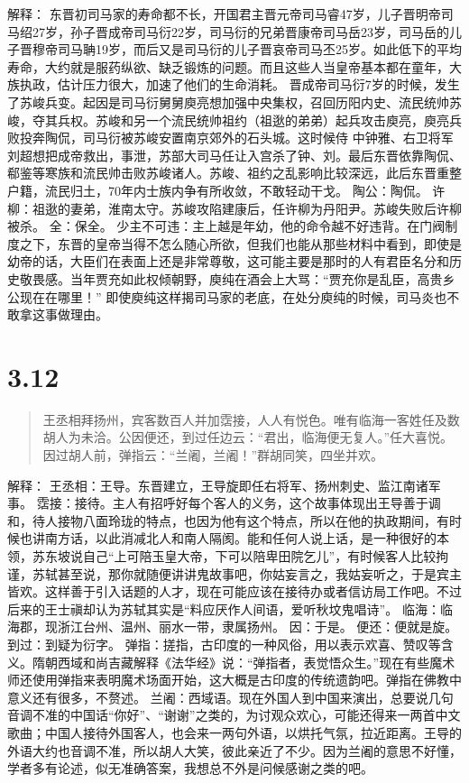 \documentclass[]{book}
\begin{document}
解释：
东晋初司马家的寿命都不长，开国君主晋元帝司马睿47岁，儿子晋明帝司马绍27岁，孙子晋成帝司马衍22岁，司马衍的兄弟晋康帝司马岳23岁，司马岳的儿子晋穆帝司马聃19岁，而后又是司马衍的儿子晋哀帝司马丕25岁。如此低下的平均寿命，大约就是服药纵欲、缺乏锻炼的问题。而且这些人当皇帝基本都在童年，大族执政，估计压力很大，加速了他们的生命消耗。
晋成帝司马衍7岁的时候，发生了苏峻兵变。起因是司马衍舅舅庾亮想加强中央集权，召回历阳内史、流民统帅苏峻，夺其兵权。苏峻和另一个流民统帅祖约（祖逖的弟弟）起兵攻击庾亮，庾亮兵败投奔陶侃，司马衍被苏峻安置南京郊外的石头城。这时候侍
中钟雅、右卫将军刘超想把成帝救出，事泄，苏部大司马任让入宫杀了钟、刘。最后东晋依靠陶侃、郗鉴等寒族和流民帅击败苏峻诸人。苏峻、祖约之乱影响比较深远，此后东晋重整户籍，流民归土，70年内士族内争有所收敛，不敢轻动干戈。
陶公：陶侃。
许柳：祖逖的妻弟，淮南太守。苏峻攻陷建康后，任许柳为丹阳尹。苏峻失败后许柳被杀。
全：保全。
少主不可违：主上越是年幼，他的命令越不好违背。在门阀制度之下，东晋的皇帝当得不怎么随心所欲，但我们也能从那些材料中看到，即使是幼帝的话，大臣们在表面上还是非常尊敬，这可能主要是那时的人有君臣名分和历史敬畏感。当年贾充如此权倾朝野，庾纯在酒会上大骂：``贾充你是乱臣，高贵乡公现在在哪里！''
即使庾纯这样揭司马家的老底，在处分庾纯的时候，司马炎也不敢拿这事做理由。

\section{3.12}\label{section-166}

\begin{quote}
王丞相拜扬州，宾客数百人并加霑接，人人有悦色。唯有临海一客姓任及数胡人为未洽。公因便还，到过任边云：``君出，临海便无复人。''任大喜悦。因过胡人前，弹指云：``兰阇，兰阇！''群胡同笑，四坐并欢。
\end{quote}

解释：
王丞相：王导。东晋建立，王导旋即任右将军、扬州刺史、监江南诸军事。
霑接：接待。主人有招呼好每个客人的义务，这个故事体现出王导善于调和，待人接物八面玲珑的特点，也因为他有这个特点，所以在他的执政期间，有时候也讲南方话，以此消减北人和南人隔阂。能和任何人说上话，是一种很好的本领，苏东坡说自己``上可陪玉皇大帝，下可以陪卑田院乞儿''，有时候客人比较拘谨，苏轼甚至说，那你就随便讲讲鬼故事吧，你姑妄言之，我姑妄听之，于是宾主皆欢。这样善于引入话题的人才，现在可能应该在接待办或者信访局工作吧。不过后来的王士禛却认为苏轼其实是``料应厌作人间语，爱听秋坟鬼唱诗''。
临海：临海郡，现浙江台州、温州、丽水一带，隶属扬州。 因：于是。
便还：便就是旋。 到过：到疑为衍字。
弹指：搓指，古印度的一种风俗，用以表示欢喜、赞叹等含义。隋朝西域和尚吉藏解释《法华经》说：``弹指者，表觉悟众生。''现在有些魔术师还使用弹指来表明魔术场面开始，这大概是古印度的传统遗韵吧。弹指在佛教中意义还有很多，不赘述。
兰阇：西域语。现在外国人到中国来演出，总要说几句音调不准的中国话``你好''、``谢谢''之类的，为讨观众欢心，可能还得来一两首中文歌曲；中国人接待外国客人，也会来一两句外语，以烘托气氛，拉近距离。王导的外语大约也音调不准，所以胡人大笑，彼此亲近了不少。因为兰阇的意思不好懂，学者多有论述，似无准确答案，我想总不外是问候感谢之类的吧。
\end{document}
